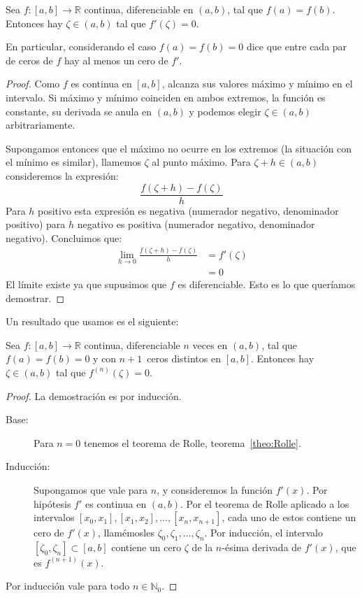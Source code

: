   \begin{theorem}[Rolle]
    \label{theo:Rolle}
    Sea \(f \colon [a, b] \to \mathbb{R}\) continua,
    diferenciable en \((a, b)\),
    tal que \(f(a) = f(b)\).
    Entonces hay \(\zeta \in (a, b)\) tal que \(f'(\zeta) = 0\).
  \end{theorem}
  En particular,
  considerando el caso \(f(a) = f(b) = 0\)
  dice que entre cada par de ceros de \(f\) hay al menos un cero de \(f'\).
  \begin{proof}
    Como \(f\) es continua en \([a, b]\),
    alcanza sus valores máximo y mínimo en el intervalo.
    Si máximo y mínimo coinciden en ambos extremos,
    la función es constante,
    su derivada se anula en \((a, b)\)
    y podemos elegir \(\zeta \in (a, b)\) arbitrariamente.

    Supongamos entonces que el máximo no ocurre en los extremos
    (la situación con el mínimo es similar),
    llamemos \(\zeta\) al punto máximo.
    Para \(\zeta + h \in (a, b)\) consideremos la expresión:
    \begin{equation*}
      \frac{f(\zeta + h) - f(\zeta)}{h}
    \end{equation*}
    Para \(h\) positivo esta expresión es negativa
    (numerador negativo,
     denominador positivo)
    para \(h\) negativo es positiva
    (numerador negativo,
     denominador negativo).
    Concluimos que:
    \begin{align*}
      \lim_{h \to 0} \frac{f(\zeta + h) - f(\zeta)}{h}
        &= f'(\zeta) \\
        &= 0
    \end{align*}
    El límite existe ya que supusimos que \(f\) es diferenciable.
    Esto es lo que queríamos demostrar.
  \end{proof}
  Un resultado que usamos es el siguiente:
  \begin{theorem}
    \label{theo:Rolle-extended}
    Sea \(f \colon [a, b] \to \mathbb{R}\) continua,
    diferenciable \(n\) veces en \((a, b)\),
    tal que \(f(a) = f(b) = 0\)
    y con \(n + 1\)~ceros distintos en \([a, b]\).
    Entonces hay \(\zeta \in (a, b)\) tal que \(f^{(n)}(\zeta) = 0\).
  \end{theorem}
  \begin{proof}
    La demostración es por inducción.
    \begin{description}
    \item[Base:]
      Para \(n = 0\) tenemos el teorema de Rolle,
      teorema~\ref{theo:Rolle}.
    \item[Inducción:]
      Supongamos que vale para \(n\),
      y consideremos la función \(f'(x)\).
      Por hipótesis \(f'\) es continua en \((a, b)\).
      Por el teorema de Rolle aplicado
      a los intervalos
        \([x_0, x_1], [x_1, x_2], \dotsc, [x_n, x_{n + 1}]\),
      cada uno de estos contiene un cero de \(f'(x)\),
      llamémosles \(\zeta_0, \zeta_1, \dotsc, \zeta_n\).
      Por inducción,
      el intervalo \([\zeta_0, \zeta_n] \subset [a, b]\)
      contiene un cero \(\zeta\)
      de la \(n\)\nobreakdash-ésima derivada de \(f'(x)\),
      que es \(f^{(n + 1)}(x)\).
    \end{description}
    Por inducción vale para todo \(n \in \mathbb{N}_0\).
  \end{proof}
